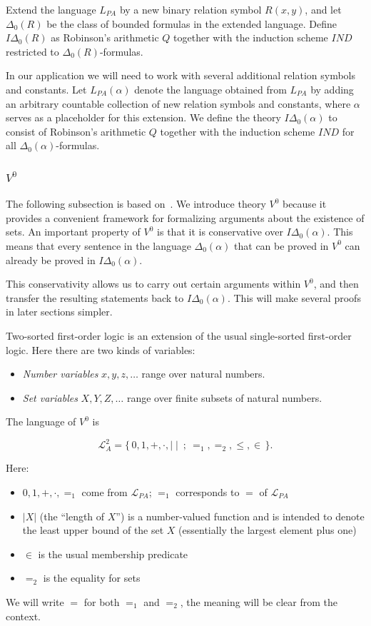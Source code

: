 \documentclass{article}
\theoremstyle{plain}
\theoremstyle{definition}
\begin{document}
Extend the language $L_{PA}$ by a new binary relation symbol $R(x,y)$, and let
$\Delta_0(R)$ be the class of bounded formulas in the extended language.
Define $I\Delta_0(R)$ as Robinson’s arithmetic $Q$ together with the induction
scheme $IND$ restricted to $\Delta_0(R)$-formulas.

In our application we will need to work with several additional relation symbols and constants.   
Let $L_{PA}(\alpha)$ denote the language obtained from $L_{PA}$ by adding an arbitrary countable collection of new relation symbols and constants, where $\alpha$ serves as a placeholder for this extension. We define the theory $I\Delta_0(\alpha)$ to consist of Robinson’s arithmetic $Q$ together with the induction scheme $IND$ for all $\Delta_0(\alpha)$-formulas.



\subsubsection{$V^0$}


The following subsection is based on~\cite[Section~5.1]{Cook_Nguyen_2010}. We introduce theory $V^0$ because it provides a convenient framework for formalizing arguments about the existence of sets. An important property of $V^0$ is that it is conservative over $I\Delta_0(\alpha)$. This means that every sentence in the language $\Delta_0(\alpha)$ that can be proved in $V^0$ can already be proved in $I\Delta_0(\alpha)$. 

This conservativity allows us to carry out certain arguments within $V^0$, and then transfer the resulting statements back to $I\Delta_0(\alpha)$. This will make several proofs in later sections simpler.

Two-sorted first-order logic is an extension of the usual single-sorted first-order
logic. Here there are two kinds of variables:
\begin{itemize}
    \item \emph{Number variables} $x, y, z, \dots$ range over natural numbers.
\item  \emph{Set variables} $X, Y, Z, \dots$ range over finite subsets of natural numbers.
\end{itemize}

The language of $V^0$ is

\[
\mathcal{L}^2_A = \{\, 0,1,+,\cdot,\mid\mid \ ;\ =_1, =_2, \le, \in \, \}.
\]

Here:
\begin{itemize}
    \item $0,1,+,\cdot,=_1$ come from $\mathcal{L}_{PA}$; $=_1$ corresponds to $=$ of $\mathcal{L}_{PA}$
    \item $\lvert X \rvert$ (the “length of $X$”) is a number-valued function and is intended to denote
the least upper bound of the set $X$ (essentially the largest element plus one)
\item $\in$ is the usual membership predicate
\item $=_2$ is the equality for sets
\end{itemize}
 We will write $=$ for both $=_1$ and $=_2$, the meaning
will be clear from the context.
\end{document}
